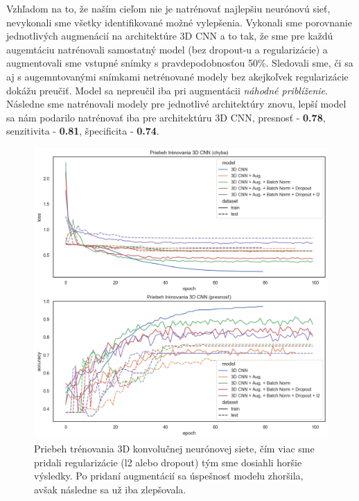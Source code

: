 Vzhľadom na to, že naším cieľom nie je natrénovať najlepšiu neurónovú sieť, nevykonali sme všetky identifikované možné vylepšenia. Vykonali sme porovnanie jednotlivých augmenácií na architektúre 3D CNN a to tak, že sme pre každú augemtáciu natrénovali samostatný model (bez dropout-u a regularizácie) a augmentovali sme vstupné snímky s pravdepodobnosťou 50\%. Sledovali sme, či sa aj s augemntovanými snímkami netrénované modely bez akejkoľvek regularizácie dokážu preučiť. Model sa nepreučil iba pri augmentácii \textit{náhodné priblíženie}. Následne sme natrénovali modely pre jednotlivé architektúry znovu, lepší model sa nám podarilo natrénovať iba pre architektúru 3D CNN, presnosť - \textbf{0.78}, senzitivita - \textbf{0.81}, špecificita - \textbf{0.74}.

\begin{figure}[H]
    \centering
    \includegraphics[width=14cm]{assets/images/3d_cnn_training.png}
    \caption{Priebeh trénovania 3D konvolučnej neurónovej siete, čím viac sme pridali regularizácie (l2 alebo dropout) tým sme dosiahli horšie výsledky. Po pridaní augmentácií sa úspešnosť modelu zhoršila, avšak následne sa už iba zlepšovala.}
    \label{fig:3d_cnn_training}
\end{figure}

